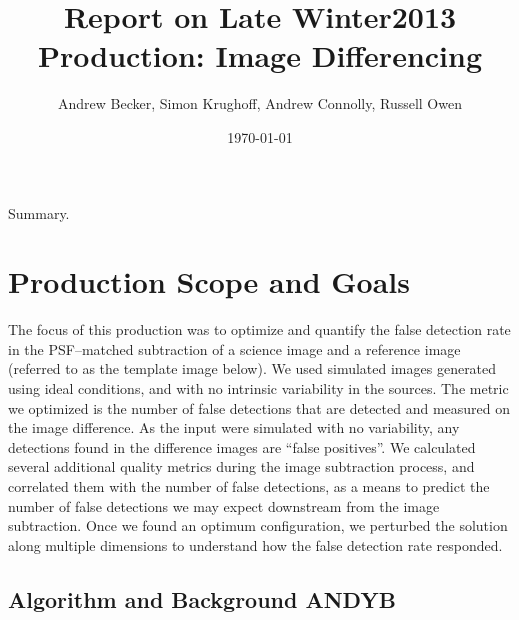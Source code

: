 \documentclass[prd, nofootinbib, floatfix, 11pt,tightenlines,times]{article}
\author{Andrew Becker, Simon Krughoff, Andrew Connolly, Russell Owen}
\title{Report on Late Winter2013 Production: Image Differencing}
\date{\today}
\begin{document}
\maketitle

Summary.

\clearpage
\tableofcontents
\clearpage

\section{Production Scope and Goals}

The focus of this production was to optimize and quantify the false
detection rate in the PSF--matched subtraction of a science image and
a reference image (referred to as the template image below).  We used
simulated images generated using ideal conditions, and with no
intrinsic variability in the sources.  The metric we optimized is the
number of false detections that are detected and measured on the image
difference.  As the input were simulated with no variability, any
detections found in the difference images are ``false positives''.  We
calculated several additional quality metrics during the image
subtraction process, and correlated them with the number of false
detections, as a means to predict the number of false detections we
may expect downstream from the image subtraction.  Once we found an
optimum configuration, we perturbed the solution along multiple
dimensions to understand how the false detection rate responded.  

\subsection{Algorithm and Background {\bf ANDYB}}
\end{document}
